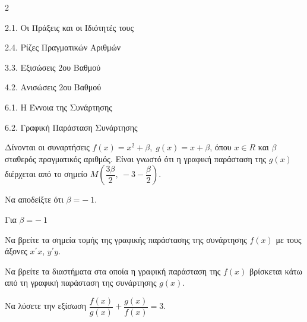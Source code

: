 \begin{ylh}{2}
    \item 2.1. Οι Πράξεις και οι Ιδιότητές τους
    \item 2.4. Ρίζες Πραγματικών Αριθμών
    \item 3.3. Εξισώσεις 2ου Βαθμού
    \item 4.2. Ανισώσεις 2ου Βαθμού
    \item 6.1. Η Έννοια της Συνάρτησης
    \item 6.2. Γραφική Παράσταση Συνάρτησης
\end{ylh}
Δίνονται οι συναρτήσεις $f(x) = x^{2} + \beta$,$\ \ g(x) = x + \beta$, όπου $x \in R$ και $\beta$ σταθερός πραγματικός αριθμός. Είναι γνωστό ότι η γραφική παράσταση της $g(x)$ διέρχεται από το σημείο $M\left( \dfrac{3\beta}{2},\  - 3 - \dfrac{\beta}{2} \right).$
\begin{alist}
\item Να αποδείξτε ότι $\beta = \mathbf{-}\ 1$.
\item Για $\beta = \mathbf{-}\ 1$
\begin{rlist}
\item
  Να βρείτε τα σημεία τομής της γραφικής παράστασης της συνάρτησης $f(x)$ με τους άξονες $x΄x$, $y΄y.$
\item
  Να βρείτε τα διαστήματα στα οποία η γραφική παράσταση της $f(x)$ βρίσκεται κάτω από τη γραφική παράσταση της συνάρτησης $g(x).$
\item
  Να λύσετε την εξίσωση $\dfrac{f(x)}{g(x)} + \dfrac{g(x)}{f(x)} = 3$.
\end{rlist}
\end{alist}

